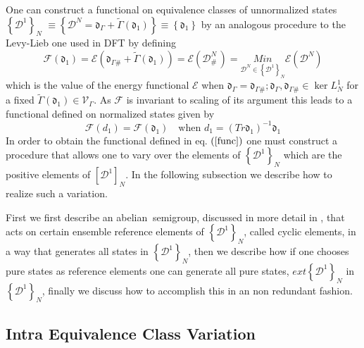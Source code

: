 \documentclass[aps,preprint]{revtex4}%
\begin{document}
One can construct a functional on equivalence classes of unnormalized states
$\left\{  \mathcal{D}^{1}\right\}  _{N}$ $\equiv\left\{  \mathcal{D}%
^{N}=\mathfrak{d}_{\Gamma}+\tilde{\Gamma}\left(  \mathfrak{d}_{1}\right)
\right\}  \equiv\left\{  \mathfrak{d}_{1}\right\}  $ by an analogous procedure
to the Levy-Lieb one \cite{LevyLieb} used in DFT by defining
\begin{equation}
\mathcal{F}\left(  \mathfrak{d}_{1}\right)  =\mathcal{E}\left(  \mathfrak{d}%
_{\Gamma\#}+\tilde{\Gamma}\left(  \mathfrak{d}_{1}\right)  \right)
=\mathcal{E}\left(  \mathcal{D}_{\#\ }^{N}\right)  =\underset{\mathcal{D}%
^{N}\in\left\{  \mathcal{D}^{1}\right\}  _{N}}{Min}\mathcal{E}\left(
\mathcal{D}^{N}\right)  \label{func}%
\end{equation}
which is the value of the energy functional $\mathcal{E}$ when $\mathfrak{d}%
_{\Gamma}=\mathfrak{d}_{\Gamma\#};\mathfrak{d}_{\Gamma},\mathfrak{d}%
_{\Gamma\#}\in\ker L_{N}^{1}$ for a fixed $\tilde{\Gamma}\left(
\mathfrak{d}_{1}\right)  \in\mathcal{V}_{\Gamma}$. As $\mathcal{F}$ is
invariant to scaling of its argument this leads to a functional defined on
normalized states given by
\begin{equation}
\mathcal{F}\left(  d_{1}\right)  =\mathcal{F}\left(  \mathfrak{d}_{1}\right)
\quad\text{when }d_{1}=\left(  Tr\mathfrak{d}_{1}\right)  ^{-1}\mathfrak{d}%
_{1}%
\end{equation}
In order to obtain the functional defined in eq. $\left(  \ref{func}\right)  $
one must construct a procedure that allows one to vary over the elements of
$\left\{  \mathcal{D}^{1}\right\}  _{N}$ which are the positive elements of
$\left[  \mathcal{D}^{1}\right]  _{N}$. In the following subsection we
describe how to realize such a variation.

First we first describe an abelian $\ $semigroup, discussed in more detail in
\cite{Weiner2002}, that acts on certain ensemble reference elements of
$\left\{  \mathcal{D}^{1}\right\}  _{N}$, called cyclic elements, in a way
that generates all states in $\left\{  \mathcal{D}^{1}\right\}  _{N}$, then we
describe how if one chooses pure states as reference elements one can generate
all pure states, $ext\left\{  \mathcal{D}^{1}\right\}  _{N}$ in $\left\{
\mathcal{D}^{1}\right\}  _{N}$, finally we discuss how to accomplish this in
an non redundant fashion.

\subsection{Intra Equivalence Class Variation \label{Intra}}
\end{document}
